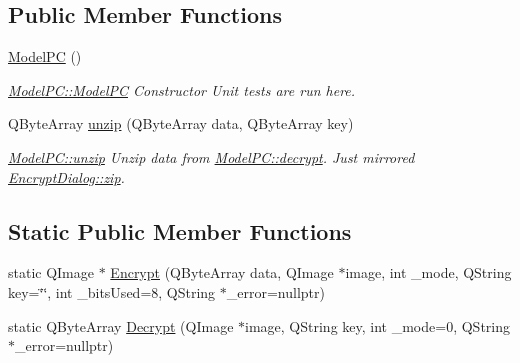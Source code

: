 \subsection*{Public Member Functions}
\begin{DoxyCompactItemize}
\item 
\hyperlink{class_model_p_c_ae12ebe65ec973c02a0de4850a7c1e31c}{Model\+PC} ()
\begin{DoxyCompactList}\small\item\em \hyperlink{class_model_p_c_ae12ebe65ec973c02a0de4850a7c1e31c}{Model\+P\+C\+::\+Model\+PC} Constructor Unit tests are run here. \end{DoxyCompactList}\item 
Q\+Byte\+Array \hyperlink{class_model_p_c_a6da88f166785a49f73b22c169f956fd0}{unzip} (Q\+Byte\+Array data, Q\+Byte\+Array key)
\begin{DoxyCompactList}\small\item\em \hyperlink{class_model_p_c_a6da88f166785a49f73b22c169f956fd0}{Model\+P\+C\+::unzip} Unzip data from \hyperlink{class_model_p_c_a5995215a34a1e1f504035715a8013809}{Model\+P\+C\+::decrypt}. Just mirrored \hyperlink{class_encrypt_dialog_a2bff820a3df4ddc36ecb07ed74b7138a}{Encrypt\+Dialog\+::zip}. \end{DoxyCompactList}\end{DoxyCompactItemize}
\subsection*{Static Public Member Functions}
\begin{DoxyCompactItemize}
\item 
static Q\+Image $\ast$ \hyperlink{class_model_p_c_a271cf9285e32df58ffbfc918e6482bbd}{Encrypt} (Q\+Byte\+Array data, Q\+Image $\ast$image, int \+\_\+mode, Q\+String key=\char`\"{}\char`\"{}, int \+\_\+bits\+Used=8, Q\+String $\ast$\+\_\+error=nullptr)
\item 
static Q\+Byte\+Array \hyperlink{class_model_p_c_a902abaea4f07995b48c0f2fea6eceb7c}{Decrypt} (Q\+Image $\ast$image, Q\+String key, int \+\_\+mode=0, Q\+String $\ast$\+\_\+error=nullptr)
\end{DoxyCompactItemize}

